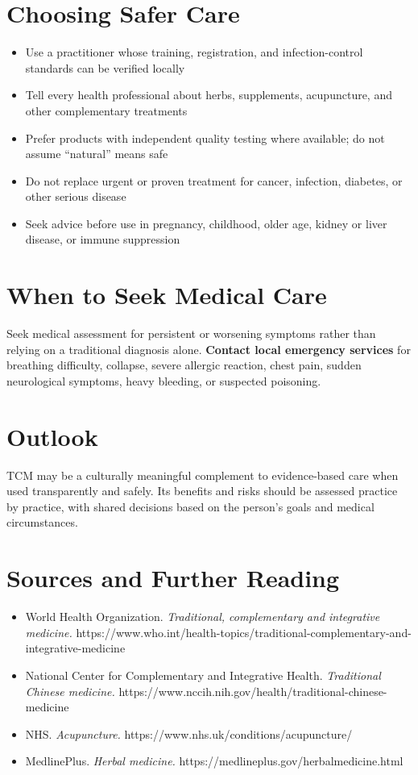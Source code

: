 \section*{Choosing Safer Care}
\begin{itemize}
    \item Use a practitioner whose training, registration, and infection-control standards can be verified locally
    \item Tell every health professional about herbs, supplements, acupuncture, and other complementary treatments
    \item Prefer products with independent quality testing where available; do not assume ``natural'' means safe
    \item Do not replace urgent or proven treatment for cancer, infection, diabetes, or other serious disease
    \item Seek advice before use in pregnancy, childhood, older age, kidney or liver disease, or immune suppression
\end{itemize}

\section*{When to Seek Medical Care}
Seek medical assessment for persistent or worsening symptoms rather than relying on a traditional diagnosis alone. \textbf{Contact local emergency services} for breathing difficulty, collapse, severe allergic reaction, chest pain, sudden neurological symptoms, heavy bleeding, or suspected poisoning.

\section*{Outlook}
TCM may be a culturally meaningful complement to evidence-based care when used transparently and safely. Its benefits and risks should be assessed practice by practice, with shared decisions based on the person's goals and medical circumstances.

\section*{Sources and Further Reading}
\begin{itemize}
    \item World Health Organization. \textit{Traditional, complementary and integrative medicine.} https://www.who.int/health-topics/traditional-complementary-and-integrative-medicine
    \item National Center for Complementary and Integrative Health. \textit{Traditional Chinese medicine.} https://www.nccih.nih.gov/health/traditional-chinese-medicine
    \item NHS. \textit{Acupuncture.} https://www.nhs.uk/conditions/acupuncture/
    \item MedlinePlus. \textit{Herbal medicine.} https://medlineplus.gov/herbalmedicine.html
\end{itemize}
